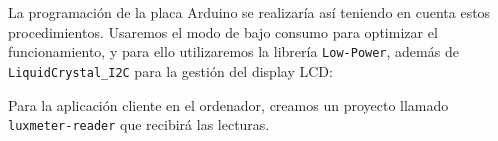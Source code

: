 La programación de la placa Arduino se realizaría así teniendo en cuenta estos
procedimientos. Usaremos el modo de bajo consumo para optimizar el
funcionamiento, y para ello utilizaremos la librería
\verb|Low-Power|\footnotemark, además de \verb|LiquidCrystal_I2C|\footnotemark
para la gestión del display LCD:





Para la aplicación cliente en el ordenador, creamos un proyecto llamado
\verb|luxmeter-reader| que recibirá las lecturas.



